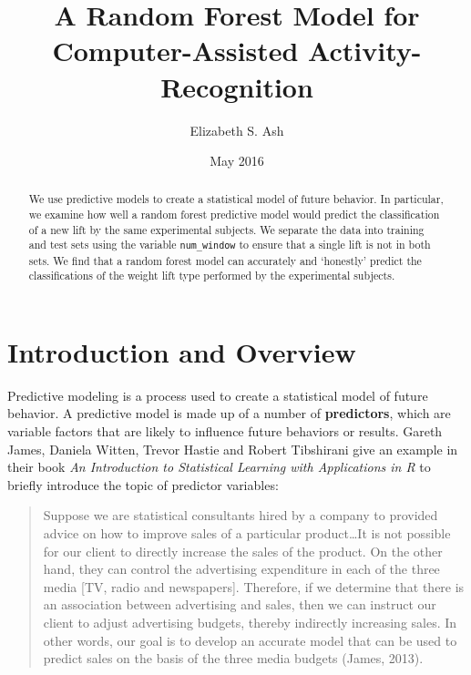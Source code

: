 \documentclass[12pt,twoside]{reedthesis}
\title{A Random Forest Model for Computer-Assisted Activity-Recognition}
\author{Elizabeth S. Ash}
\date{May 2016}
\begin{document}
      \maketitle
  
  \frontmatter %
  \pagestyle{empty} %

  
  

      \hypersetup{linkcolor=black}
    \setcounter{tocdepth}{3}
    \tableofcontents
  
      \listoftables
  
      \listoffigures
  
      \begin{abstract}
      We use predictive models to create a statistical model of future
      behavior. In particular, we examine how well a random forest predictive
      model would predict the classification of a new lift by the same
      experimental subjects. We separate the data into training and test sets
      using the variable \texttt{num\_window} to ensure that a single lift is
      not in both sets. We find that a random forest model can accurately and
      `honestly' predict the classifications of the weight lift type performed
      by the experimental subjects.
    \end{abstract}
  
  
  \mainmatter %
  \pagestyle{fancyplain} %

  \chapter*{Introduction and Overview}\label{introduction-and-overview}
  
  Predictive modeling is a process used to create a statistical model of
  future behavior. A predictive model is made up of a number of
  \textbf{predictors}, which are variable factors that are likely to
  influence future behaviors or results. Gareth James, Daniela Witten,
  Trevor Hastie and Robert Tibshirani give an example in their book
  \emph{An Introduction to Statistical Learning with Applications in R} to
  briefly introduce the topic of predictor variables:
  
  \begin{quote}
  Suppose we are statistical consultants hired by a company to provided
  advice on how to improve sales of a particular product\ldots{}It is not
  possible for our client to directly increase the sales of the product.
  On the other hand, they can control the advertising expenditure in each
  of the three media {[}TV, radio and newspapers{]}. Therefore, if we
  determine that there is an association between advertising and sales,
  then we can instruct our client to adjust advertising budgets, thereby
  indirectly increasing sales. In other words, our goal is to develop an
  accurate model that can be used to predict sales on the basis of the
  three media budgets (James, 2013).
  \end{quote}
  
\end{document}
